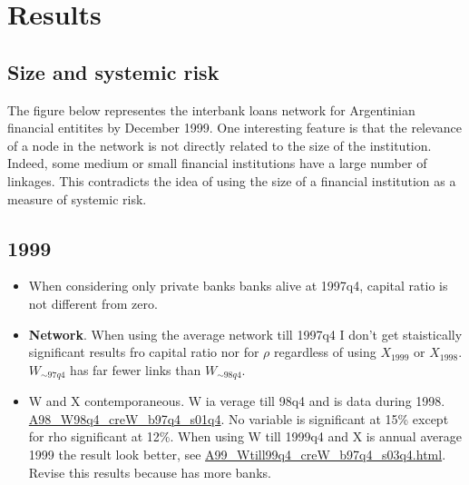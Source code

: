 \documentclass[11pt,final]{article}%
\begin{document}
\section{Results}

\subsection{Size and systemic risk}
The figure below representes the interbank loans network for Argentinian financial entitites by December 1999. One interesting feature is that the relevance of a node in the network is not directly related to the size of the institution. Indeed, some medium or small financial institutions have a large number of linkages. This contradicts the idea of using the size of a financial institution as a measure of systemic risk. 

\subsection{1999}
\begin{itemize}
\item When considering only private banks banks alive at 1997q4, capital ratio is not different from zero.
\item \textbf{Network}. When using the average network till 1997q4 I don't get staistically significant results fro capital ratio nor for $\rho$ regardless of using $X_1999$ or $X_1998$. $W_{\sim 97q4}$ has far fewer links than $W_{\sim 98q4}$.
\item W and X contemporaneous. W ia verage till 98q4 and  is data during 1998. \url{A98_W98q4_creW_b97q4_s01q4}. No variable is significant at 15\% except for rho significant at 12\%. When using W till 1999q4 and X is annual average 1999 the result look better, see \url{A99_Wtill99q4_creW_b97q4_s03q4.html}. Revise this results because has more banks. 
\end{itemize}
\end{document}
